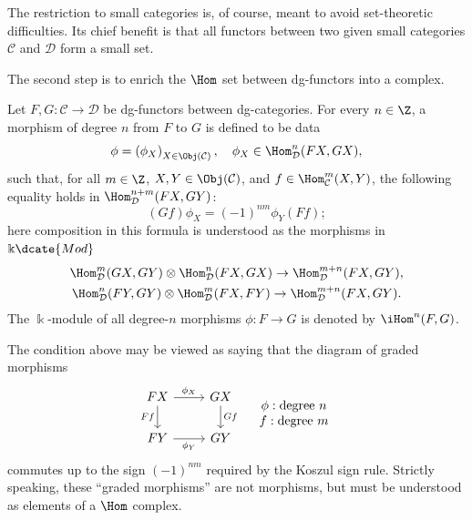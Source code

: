 The restriction to small categories is, of course, meant to avoid
set-theoretic difficulties. Its chief benefit is that all functors between
two given small categories $\mathcal{C}$ and $\mathcal{D}$ form a small set.

The second step is to enrich the $\Hom$ set between dg-functors into a
complex.

\begin{definition}
	Let $F,G:\mathcal{C}\to\mathcal{D}$ be dg-functors between dg-categories.
	For every $n\in\Z$, a morphism of degree $n$ from $F$ to $G$ is defined to
	be data
	\[ \phi = \left( \phi_X \right)_{X \in \Obj(\mathcal{C})}, \quad \phi_X \in \Hom_{\mathcal{D}}^n(FX, GX), \]
	such that, for all $m\in\Z$, $X,Y\in\Obj(\mathcal{C})$, and
	$f\in\Hom^m_{\mathcal{C}}(X,Y)$, the following equality holds in
	$\Hom^{n+m}_{\mathcal{D}}(FX,GY)$:
	\[ (Gf) \phi_X = (-1)^{nm} \phi_Y (Ff); \]
	here composition in this formula is understood as the morphisms in
	$\Bbbk\dcate{Mod}$
	\begin{gather*}
		\Hom^m_{\mathcal{D}}(GX, GY) \otimes \Hom^n_{\mathcal{D}}(FX, GX) \to \Hom^{m+n}_{\mathcal{D}}(FX, GY), \\
		\Hom^n_{\mathcal{D}}(FY, GY) \otimes \Hom^m_{\mathcal{D}}(FX, FY) \to \Hom^{m+n}_{\mathcal{D}}(FX, GY).
	\end{gather*}
	The $\Bbbk$-module of all degree-$n$ morphisms $\phi:F\to G$ is denoted by
	$\iHom^n(F,G)$.
\end{definition}

The condition above may be viewed as saying that the diagram of graded
morphisms
\[\begin{tikzcd}
	FX \arrow[r, "{\phi_X}"] \arrow[d, "Ff"'] & GX \arrow[d, "Gf"] \\
	FY \arrow[r, "{\phi_Y}"'] & GY
\end{tikzcd} \quad
\begin{array}{cc}
	\phi: \text{degree }n \\
	f: \text{degree }m
\end{array}\]
commutes up to the sign $(-1)^{nm}$ required by the Koszul sign rule.
Strictly speaking, these ``graded morphisms'' are not morphisms, but must be
understood as elements of a $\Hom$ complex.

